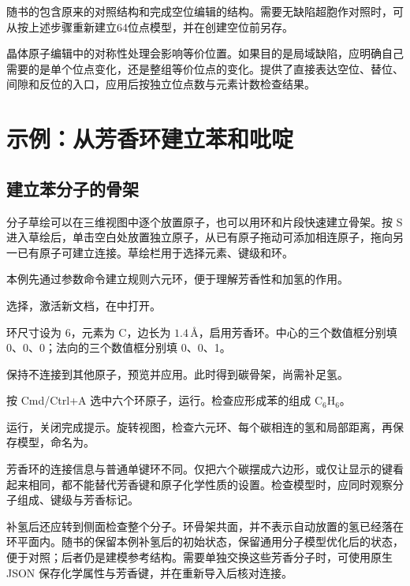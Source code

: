 随书的包含原来的对照结构和完成空位编辑的结构。需要无缺陷超胞作对照时，可从按上述步骤重新建立64位点模型，并在创建空位前另存。

晶体原子编辑中的对称性处理会影响等价位置。如果目的是局域缺陷，应明确自己需要的是单个位点变化，还是整组等价位点的变化。提供了直接表达空位、替位、间隙和反位的入口，应用后按独立位点数与元素计数检查结果。

\section{示例：从芳香环建立苯和吡啶}

\subsection{建立苯分子的骨架}

分子草绘可以在三维视图中逐个放置原子，也可以用环和片段快速建立骨架。按 S 进入草绘后，单击空白处放置独立原子，从已有原子拖动可添加相连原子，拖向另一已有原子可建立连接。草绘栏用于选择元素、键级和环。

本例先通过参数命令建立规则六元环，便于理解芳香性和加氢的作用。

\begin{steps}
  \item 选择，激活新文档，在中打开。
  \item 环尺寸设为 6，元素为 C，边长为 $1.4\,\text{\AA}$，启用芳香环。中心的三个数值框分别填 0、0、0；法向的三个数值框分别填 0、0、1。
  \item 保持不连接到其他原子，预览并应用。此时得到碳骨架，尚需补足氢。
  \item 按 Cmd/Ctrl+A 选中六个环原子，运行。检查应形成苯的组成 $\mathrm{C_6H_6}$。
  \item 运行，关闭完成提示。旋转视图，检查六元环、每个碳相连的氢和局部距离，再保存模型，命名为。
\end{steps}

芳香环的连接信息与普通单键环不同。仅把六个碳摆成六边形，或仅让显示的键看起来相同，都不能替代芳香键和原子化学性质的设置。检查模型时，应同时观察分子组成、键级与芳香标记。

补氢后还应转到侧面检查整个分子。环骨架共面，并不表示自动放置的氢已经落在环平面内。随书的保留本例补氢后的初始状态，\mbox{}保留通用分子模型优化后的状态，便于对照；后者仍是建模参考结构。需要单独交换这些芳香分子时，可使用原生 JSON 保存化学属性与芳香键，并在重新导入后核对连接。

